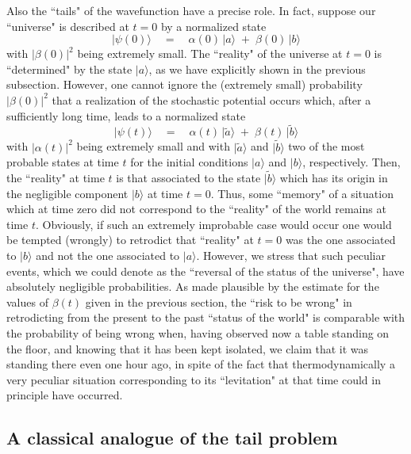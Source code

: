 \documentclass[10pt,a4paper]{article}
\begin{document}
Also the ``tails" of the wavefunction have a precise role. In
fact, suppose our ``universe" is described at $t = 0$ by a
normalized state
\begin{equation}
|\psi(0)\rangle \quad = \quad \alpha(0)\,|a\rangle \; + \;
\beta(0)\, |b\rangle
\end{equation}
with $|\beta(0)|^{2}$ being extremely small. The ``reality" of the
universe at $t = 0$ is ``determined" by the state $|a\rangle$, as
we have explicitly shown in the previous subsection. However, one
cannot ignore the (extremely small) probability $|\beta(0)|^{2}$
that a realization of the stochastic potential occurs which, after
a sufficiently long time, leads to a normalized state
\begin{equation}
|\psi(t)\rangle \quad = \quad \alpha(t)\,|\tilde a\rangle \; + \;
\beta(t)\, |\tilde b\rangle
\end{equation}
with $|\alpha(t)|^{2}$  being extremely small and with $|\tilde
a\rangle$ and $|\tilde b\rangle$ two of the most probable states
at time $t$ for the initial conditions $|a\rangle$ and
$|b\rangle$, respectively. Then, the ``reality" at time $t$ is
that associated to the state $|\tilde b\rangle$ which has its
origin in the negligible component $|b\rangle$ at time $t = 0$.
Thus, some ``memory" of a situation which at time zero did not
correspond to the ``reality" of the world remains at time $t$.
Obviously, if such an extremely improbable case would occur one
would be tempted (wrongly) to retrodict that ``reality" at $t = 0$
was the one associated to $|b\rangle$ and not the one associated
to $|a\rangle$. However, we stress that such peculiar events,
which we could denote as the ``reversal of the status of the
universe", have absolutely negligible probabilities. As made
plausible by the estimate for the values of $\beta(t)$ given in
the previous section, the ``risk to be wrong" in retrodicting from
the present to the past ``status of the world" is comparable with
the probability of being wrong when, having observed now a table standing
on the floor, and knowing that it has been kept isolated, we claim
that it was standing there even one hour ago, in spite of the fact that
thermodynamically a very peculiar situation corresponding to its
``levitation" at that time could in principle have occurred.

\subsection{A classical analogue of the tail problem}
\label{sec137}
\end{document}
